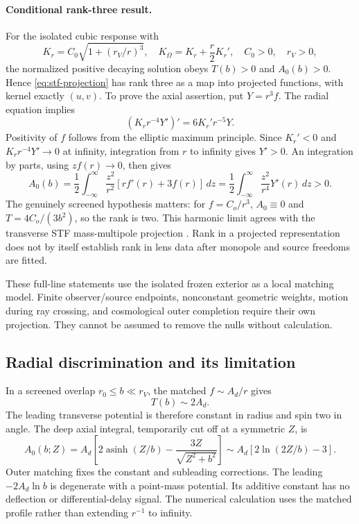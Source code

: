 \paragraph{Conditional rank-three result.}
For the isolated cubic response with
\begin{equation}
 K_r=C_0\sqrt{1+(r_V/r)^3},\quad
 K_\Omega=K_r+\frac r2K_r',\quad C_0>0,\quad r_V>0,
\end{equation}
the normalized positive decaying solution obeys $T(b)>0$ and $A_0(b)>0$. Hence \eqref{eq:stf-projection} has rank three as a map into projected functions, with kernel exactly $(u,v)$. To prove the axial assertion, put $Y=r^3f$. The radial equation implies
\begin{equation}
 (K_r r^{-4}Y')'=6K_r'r^{-5}Y.
\end{equation}
Positivity of $f$ follows from the elliptic maximum principle. Since $K_r'<0$ and $K_r r^{-4}Y'\to0$ at infinity, integration from $r$ to infinity gives $Y'>0$. An integration by parts, using $zf(r)\to0$, then gives
\begin{equation}
 A_0(b)=\frac12\int_{-\infty}^{\infty}\frac{z^2}{r^2}
 [rf'(r)+3f(r)]\,dz
 =\frac12\int_{-\infty}^{\infty}\frac{z^2}{r^4}Y'(r)\,dz>0.
\end{equation}
The genuinely screened hypothesis matters: for $f=C_o/r^3$, $A_0\equiv0$ and $T=4C_o/(3b^2)$, so the rank is two. This harmonic limit agrees with the transverse STF mass-multipole projection \cite{Turyshev2022}. Rank in a projected representation does not by itself establish rank in lens data after monopole and source freedoms are fitted.

These full-line statements use the isolated frozen exterior as a local matching model. Finite observer/source endpoints, nonconstant geometric weights, motion during ray crossing, and cosmological outer completion require their own projection. They cannot be assumed to remove the nulls without calculation.

\subsection{Radial discrimination and its limitation}

In a screened overlap $r_0\le b\ll r_V$, the matched $f\sim A_d/r$ gives
\begin{equation}
 T(b)\sim2A_d.
\end{equation}
The leading transverse potential is therefore constant in radius and spin two in angle. The deep axial integral, temporarily cut off at a symmetric $Z$, is
\begin{equation}
 A_0(b;Z)=A_d\left[2\operatorname{asinh}(Z/b)
 -\frac{3Z}{\sqrt{Z^2+b^2}}\right]
 \sim A_d[2\ln(2Z/b)-3].
\end{equation}
Outer matching fixes the constant and subleading corrections. The leading $-2A_d\ln b$ is degenerate with a point-mass potential. Its additive constant has no deflection or differential-delay signal. The numerical calculation uses the matched profile rather than extending $r^{-1}$ to infinity.


